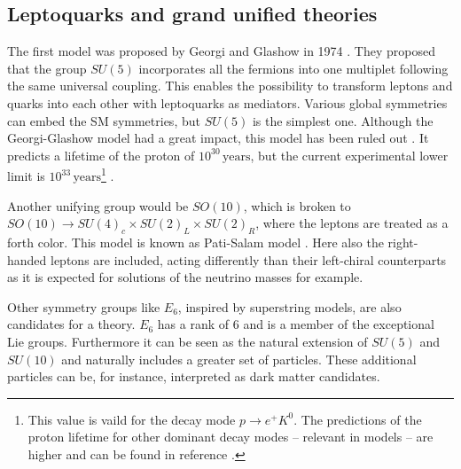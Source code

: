 \subsection{Leptoquarks and grand unified theories}\label{GUTandLQ}
The first {\GUT} model was proposed by Georgi and Glashow in 1974 \cite{GeorgiGlashow}. They proposed that the group $SU(5)$ incorporates all the fermions into one multiplet following the same universal coupling. This enables the possibility to transform leptons and quarks into each other with leptoquarks as mediators. Various global symmetries can embed the SM symmetries, but $SU(5)$ is the simplest one. \cite{Perkins} Although the Georgi-Glashow model had a great impact, this model has been ruled out \cite{GeorgiGlashowruledout}. It predicts a lifetime of the proton of $10^{30}\,\text{years}$, but the current experimental lower limit is $10^{33}\,\text{years}$\footnote{This value is vaild for the decay mode $p\rightarrow e^+K^0$. The predictions of the proton lifetime for other dominant decay modes -- relevant in {\GUT} models -- are higher and can be found in reference \cite{protonlifetime}.} \cite{Griffiths}\cite{protonlifetime}.\par%
Another unifying group would be $SO(10)$, which is broken to $SO(10)\rightarrow SU(4)_c\times SU(2)_L\times SU(2)_R$, where the leptons are treated as a forth color. \cite{PatiSalamExplanation} This model is known as Pati-Salam {\GUT} model \cite{PatiSalam}. Here also the right-handed leptons are included, acting differently than their left-chiral counterparts as it is expected for solutions of the neutrino masses for example. \cite{PatiSalamExplanation}\par
Other symmetry groups like $E_6$, inspired by superstring models, are also candidates for a {\GUT} theory. \cite{E6} $E_6$ has a rank of $6$ and is a member of the exceptional Lie groups. Furthermore it can be seen as the natural extension of $SU(5)$ and $SU(10)$ and naturally includes a greater set of particles. These additional particles can be, for instance, interpreted as dark matter candidates. \cite{E6explanation}
%
%
